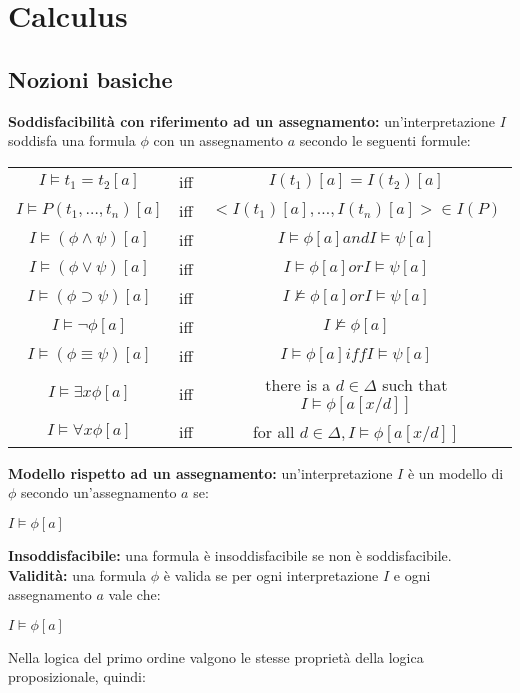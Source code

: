 \documentclass[../main.tex]{subfiles}
\begin{document}
   \chapter{Calculus}
   \section{Nozioni basiche}
   \textbf{Soddisfacibilità con riferimento ad un assegnamento:} un'interpretazione $I$ soddisfa una formula $\phi$ con un assegnamento $a$ secondo le seguenti formule:
   \begin{center}
      \begin{tabular}{c c c}
         $I \models t_1 = t_2 [a]$ & iff & $I(t_1)[a]=I(t_2)[a]$\\
         $I \models P(t_1, \dots ,t_n)[a]$ & iff & $< I(t_1)[a], \dots , I(t_n)[a] > \in I(P)$\\
         $I \models (\phi \land \psi)[a]$ & iff & $I \models \phi[a] and I \models \psi[a]$\\
         $I \models (\phi \lor \psi)[a]$ & iff & $I \models \phi[a] or I \models \psi[a]$\\
         $I \models (\phi \supset \psi)[a]$ & iff & $I \not \models \phi [a] or I \models \psi[a]$\\
         $I \models \lnot \phi[a]$ & iff & $I \not \models \phi[a]$\\
         $I \models (\phi \equiv \psi)[a]$ & iff & $I \models \phi[a] iff I \models \psi[a]$\\
         $I \models \exists x \phi[a]$ & iff & there is a $d \in \Delta$ such that $I \models \phi[a[x/d]]$\\
         $I \models \forall x \phi[a]$ & iff & for all $d \in \Delta, I \models \phi[a[x/d]]$
      \end{tabular}
   \end{center}
   \textbf{Modello rispetto ad un assegnamento:} un'interpretazione $I$ è un modello di $\phi$ secondo un'assegnamento $a$ se:
   \begin{center}
      $I \models \phi[a]$
   \end{center}
   \textbf{Insoddisfacibile:} una formula è insoddisfacibile se non è soddisfacibile.
   \spazio
   \textbf{Validità:} una formula $\phi$ è valida se per ogni interpretazione $I$ e ogni assegnamento $a$ vale che:
   \begin{center}
      $I \models \phi[a]$
   \end{center}
   Nella logica del primo ordine valgono le stesse proprietà della logica proposizionale, quindi:
\end{document}
